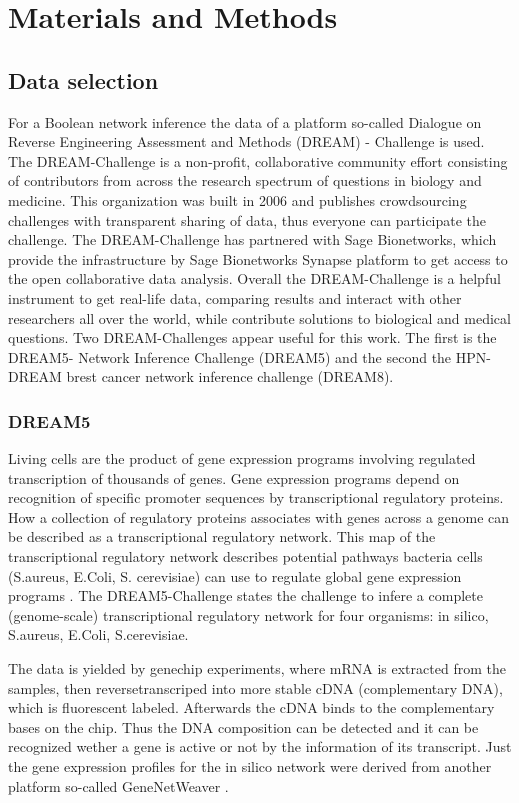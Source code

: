 \chapter{Materials and Methods}
\section{Data selection}
For a Boolean network inference the data of a platform so-called Dialogue on Reverse Engineering Assessment and Methods (DREAM) - Challenge is used. The DREAM-Challenge is a non-profit, collaborative community effort consisting of contributors from across the research spectrum of questions in biology and medicine. This organization was built in 2006 and publishes crowdsourcing challenges with transparent sharing of data, thus everyone can participate the challenge. The DREAM-Challenge has partnered with Sage Bionetworks, which provide the infrastructure by Sage Bionetworks Synapse platform to get access to the open collaborative data analysis. Overall the DREAM-Challenge is a helpful instrument to get real-life data, comparing results and interact with other researchers all over the world, while contribute solutions to biological and medical questions.
Two DREAM-Challenges appear useful for this work. The first is the DREAM5- Network Inference Challenge (DREAM5) and the second the HPN-DREAM brest cancer network inference challenge (DREAM8)\citep{DreamChalleneg Homepage}. 

\subsection{DREAM5}
Living cells are the product of gene expression programs involving regulated transcription of thousands of genes. Gene expression programs depend on recognition of specific promoter sequences by transcriptional regulatory proteins. How a collection of regulatory proteins associates with genes across a genome can be described as a transcriptional regulatory network. This map of the transcriptional regulatory network describes potential pathways bacteria cells (S.aureus, E.Coli, S. cerevisiae) can use to regulate global gene expression programs \citep{Lee799}.
The DREAM5-Challenge states the challenge to infere a complete (genome-scale) transcriptional regulatory network for four organisms: in silico, S.aureus, E.Coli, S.cerevisiae. 


The data is yielded by genechip experiments, where mRNA is extracted from the samples, then reversetranscriped into more stable cDNA (complementary DNA), which is fluorescent labeled. Afterwards the cDNA binds to the complementary bases on the chip. Thus the DNA composition can be detected and it can be recognized wether a gene is active or not by the information of its transcript.
Just the gene expression profiles for the in silico network were derived from another platform so-called GeneNetWeaver \citep{GeneNetWeaver}.

